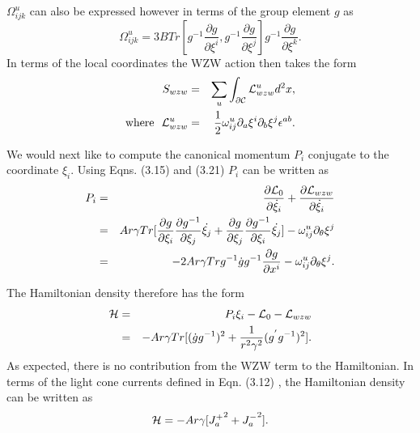 \documentclass[a4paper,12pt]{article}
\begin{document}
${\Omega}^{u}_{ijk}$ can also be expressed however
 in terms of the group element $g$
as 
\begin{equation}
{\Omega}^{u}_{ijk}=3BTr[g^{-1}{\frac{{\partial}g}
{{\partial}{\xi}^{i}}},g^{-1}{\frac{{\partial}g}
{{\partial}{\xi}^{j}}}]g^{-1}{\frac{{\partial}g}{{\partial}{\xi}^{k}}}.
\end{equation}
In terms of the local coordinates the WZW action then takes the form
\begin{eqnarray}
S_{wzw}&=&\sum_{u}\int_{{\partial}{\cal C}}{\cal L}^{u}_{wzw}d^2x,\nonumber\\
{\rm where}~~
{\cal L}^{u}_{wzw}&=&\frac{1}{2}{\omega}^{u}_{ij}
{\partial}_{a}{\xi}^{i}{\partial}_{b}{\xi}^{j}{\epsilon}^{ab}.\nonumber\\
\end{eqnarray}

We would next like to compute the canonical momentum $P_i$ conjugate to the
coordinate ${\xi}_i$.
Using Eqns. (3.15) and (3.21) $P_i$ can be written as 
\begin{eqnarray}
P_i&=&\frac{{\partial}{\cal L}_0}{{\partial}{{\dot{\xi}}_i}}+
\frac{{\partial}{\cal L}_{wzw}}{{\partial}{{\dot{\xi}}_i}}\nonumber\\
&=&Ar{\gamma}Tr[\frac{{\partial}g}{{\partial}{\xi}_i}
\frac{{\partial}g^{-1}}{{\partial}{\xi}_j}\dot{{\xi}_j} 
+\frac{{\partial}g}{{\partial}{\xi}_j}
\frac{{\partial}g^{-1}}{{\partial}{\xi}_i}\dot{{\xi}_j}] -
{\omega}^{u}_{ij}{\partial}_{\theta}{\xi}^{j}\nonumber\\
&=&-2Ar{\gamma}Trg^{-1}\dot{g}g^{-1}
\frac{{\partial}g}{{\partial}{x^{i}}}-{\omega}^{u}_{ij}
{\partial}_{\theta}{\xi}^{j}.\nonumber\\
\end{eqnarray}

The Hamiltonian density therefore has the form
\begin{eqnarray}
{\cal H}&=&P_i{\xi}_i -{\cal L}_0 -{\cal L}_{wzw}\nonumber\\
&=&-Ar{\gamma}Tr [ (\dot{g}g^{-1})^2 
+\frac{1}{r^2{\gamma}^2}({g^{'}}g^{-1})^{2}].\nonumber\\
\end{eqnarray}
As expected, there is no contribution from the WZW term to the Hamiltonian. 
In terms of the light cone currents defined in Eqn. (3.12) ,
the Hamiltonian density can be written as
\begin{equation}
{\cal H}=-Ar{\gamma}[{J_a^{+}}^2 +{J_a^{-}}^2].
\end{equation}
\end{document}
